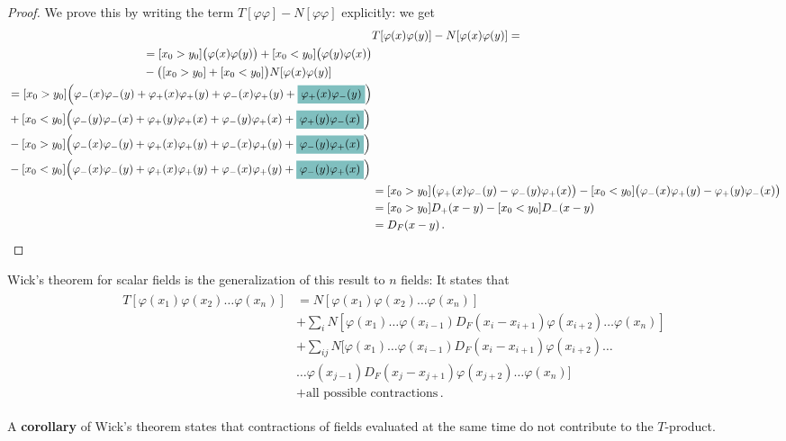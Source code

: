 \documentclass[main.tex]{subfiles}
\begin{document}
\begin{proof}
We prove this by writing the term \(T[\varphi \varphi ] - N[ \varphi \varphi ]\) explicitly: we get 
%
\begin{align}
& T[\varphi (x)\varphi (y)] - N[\varphi (x) \varphi (y)] = \\
\begin{split}
&= [x_0 > y_0 ] \qty(\varphi (x) \varphi (y)) + [x_0 < y_0 ] \qty(\varphi (y) \varphi (x)) \\
& 
- \qty([x_0 > y_0 ] + [x_0 < y_0 ]) N [\varphi (x)\varphi (y)] 
\end{split}  \\
\begin{split}
&= 
[x_0 > y_0 ] \qty(\varphi_{-} (x) \varphi_{-} (y) + \varphi_{+} (x) \varphi_{+} (y) + \varphi_{-} (x) \varphi_{+} (y) + \hlc{teal}{\varphi_{+} (x) \varphi_{-} (y)}) \\
& 
+ 
[x_0 < y_0 ] \qty(\varphi_{-} (y) \varphi_{-} (x) + \varphi_{+} (y) \varphi_{+} (x) + \varphi_{-} (y) \varphi_{+} (x) + \hlc{teal}{\varphi_{+} (y) \varphi_{-} (x)}) 
\\
& 
-
[x_0 > y_0 ]
\qty(\varphi_{-} (x) \varphi_{-} (y) + \varphi_{+} (x) \varphi_{+} (y) + \varphi_{-} (x) \varphi_{+} (y) + \hlc{teal}{\varphi_{-} (y) \varphi_{+} (x)} ) 
\\
& 
-
[x_0 < y_0 ]
\qty(\varphi_{-} (x) \varphi_{-} (y) + \varphi_{+} (x) \varphi_{+} (y) + \varphi_{-} (x) \varphi_{+} (y) + \hlc{teal}{\varphi_{-} (y) \varphi_{+} (x)} ) 
\end{split}  \\
&= [x_0 > y_0 ] \qty(\varphi_{+} (x) \varphi_{-} (y) - \varphi_{-} (y) \varphi_{+} (x))
- [x_0 < y_0 ] \qty(\varphi_{-} (x) \varphi_{+} (y) - \varphi_{+}(y) \varphi_{-}(x))  \\
&= 
[x_0 > y_0 ]
D_+ (x-y)
-
[x_0 < y_0 ]
D_- (x-y) \\
&= D_F (x-y)
\,.
\end{align}
\end{proof}

Wick's theorem for scalar fields is the generalization of this result to \(n\) fields: 
It states that 
%
\begin{align}
\begin{split}
T [\varphi (x_1 ) \varphi (x_2 ) \dots \varphi (x_n)]
&=
N [\varphi (x_1 ) \varphi (x_2 )\dots \varphi (x_n)] \\
&+ \sum_{i} N[\varphi (x_1 )\dots \varphi (x_{i-1}) D_F (x_i- x_{i+1}) \varphi (x_{i+2}) \dots \varphi (x_n)]  \\
&+ \sum _{ij}
N[\varphi (x_1 )\dots \varphi (x_{i-1}) D_F (x_i- x_{i+1}) \varphi (x_{i+2}) \dots \\
& \dots \varphi (x_{j-1}) D_F (x_j- x_{j+1}) \varphi (x_{j+2}) \dots \varphi (x_n)]  \\
&+ \text{all possible contractions}
\,.
\end{split}
\end{align}

A \textbf{corollary} of Wick's theorem states that contractions of fields evaluated at the same time do not contribute to the \(T\)-product. 
\end{document}
